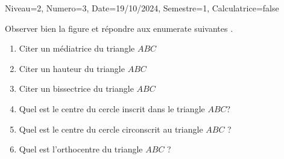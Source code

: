 \documentclass[a4paper,12pt]{article}
\begin{document}
\begin{Maquette}[DS]{Niveau=2, Numero=3, Date=19/10/2024, Semestre=1, Calculatrice=false}

\begin{exercice}

Observer bien la figure et répondre aux enumerate suivantes .
\begin{enumerate}
\item{} Citer un médiatrice du triangle $ABC$
\anserline[1]
\item{} Citer un hauteur du triangle $ABC$
\anserline[1]
\item{} Citer un bissectrice du triangle $ABC$
\anserline[1]
\item{} Quel est le centre du cercle inscrit dans le triangle $ABC$?
\anserline[1]
\item{} Quel est le centre du cercle circonscrit au triangle $ABC$ ?
\anserline[1]
\item{} Quel est l'orthocentre du triangle $ABC$ ?
\anserline[1]
\end{enumerate}
\end{exercice}


\end{Maquette}
\end{document}
